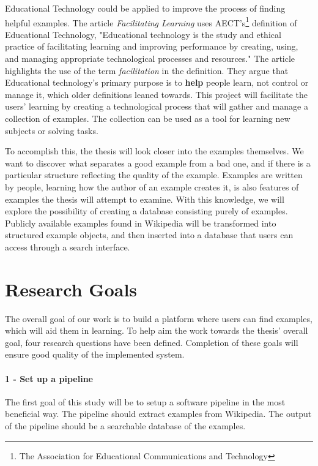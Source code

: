 Educational Technology could be applied to improve the process of finding helpful examples. The article \textit{Facilitating Learning} \cite{e-learning} uses AECT's\footnote{The Association for Educational Communications and Technology} definition of Educational Technology, "Educational technology is the study and ethical practice of facilitating learning and improving performance by creating, using, and managing appropriate technological processes and resources." The article highlights the use of the term \textit{facilitation} in the definition. They argue that Educational technology's primary purpose is to \textbf{help} people learn, not control or manage it, which older definitions leaned towards. This project will facilitate the users' learning by creating a technological process that will gather and manage a collection of examples. The collection can be used as a tool for learning new subjects or solving tasks.

To accomplish this, the thesis will look closer into the examples themselves. We want to discover what separates a good example from a bad one, and if there is a particular structure reflecting the quality of the example. Examples are written by people, learning how the author of an example creates it, is also features of examples the thesis will attempt to examine. With this knowledge, we will explore the possibility of creating a database consisting purely of examples. Publicly available examples found in Wikipedia will be transformed into structured example objects, and then inserted into a database that users can access through a search interface. 



\section{Research Goals}

The overall goal of our work is to build a platform where users can find examples, which will aid them in learning. To help aim the work towards the thesis' overall goal, four research questions have been defined. Completion of these goals will ensure good quality of the implemented system.


\paragraph{1 - Set up a pipeline}
The first goal of this study will be to setup a software pipeline in the most beneficial way. The pipeline should extract examples from Wikipedia. The output of the pipeline should be a searchable database of the examples.

